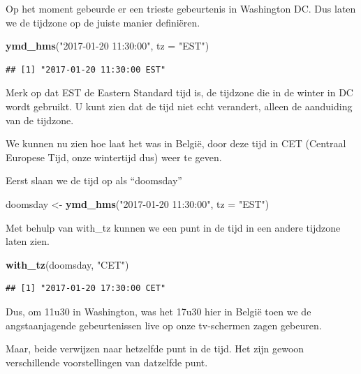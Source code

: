 \documentclass[]{tufte-book}
\newenvironment{Shaded}{}{}
\newcommand{\DataTypeTok}[1]{\textcolor[rgb]{0.56,0.13,0.00}{#1}}
\newcommand{\KeywordTok}[1]{\textcolor[rgb]{0.00,0.44,0.13}{\textbf{#1}}}
\newcommand{\NormalTok}[1]{#1}
\newcommand{\StringTok}[1]{\textcolor[rgb]{0.25,0.44,0.63}{#1}}
\begin{document}
Op het moment gebeurde er een trieste gebeurtenis in Washington DC. Dus laten we de tijdzone op de juiste manier definiëren.

\begin{Shaded}
\begin{Highlighting}[]
\KeywordTok{ymd_hms}\NormalTok{(}\StringTok{"2017-01-20 11:30:00"}\NormalTok{, }\DataTypeTok{tz =} \StringTok{"EST"}\NormalTok{)}
\end{Highlighting}
\end{Shaded}

\begin{verbatim}
## [1] "2017-01-20 11:30:00 EST"
\end{verbatim}

Merk op dat EST de Eastern Standard tijd is, de tijdzone die in de winter in DC wordt gebruikt. U kunt zien dat de tijd niet echt verandert, alleen de aanduiding van de tijdzone.

We kunnen nu zien hoe laat het was in België, door deze tijd in CET (Centraal Europese Tijd, onze wintertijd dus) weer te geven.

Eerst slaan we de tijd op als ``doomsday''

\begin{Shaded}
\begin{Highlighting}[]
\NormalTok{doomsday <-}\StringTok{ }\KeywordTok{ymd_hms}\NormalTok{(}\StringTok{"2017-01-20 11:30:00"}\NormalTok{, }\DataTypeTok{tz =} \StringTok{"EST"}\NormalTok{)}
\end{Highlighting}
\end{Shaded}

Met behulp van with\_tz kunnen we een punt in de tijd in een andere tijdzone laten zien.

\begin{Shaded}
\begin{Highlighting}[]
\KeywordTok{with_tz}\NormalTok{(doomsday, }\StringTok{"CET"}\NormalTok{)}
\end{Highlighting}
\end{Shaded}

\begin{verbatim}
## [1] "2017-01-20 17:30:00 CET"
\end{verbatim}

Dus, om 11u30 in Washington, was het 17u30 hier in België toen we de angstaanjagende gebeurtenissen live op onze tv-schermen zagen gebeuren.

Maar, beide verwijzen naar hetzelfde punt in de tijd. Het zijn gewoon verschillende voorstellingen van datzelfde punt.
\end{document}
